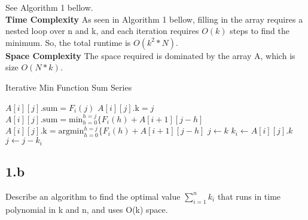 \documentclass[11pt]{article}
\begin{document}
\begin{solution}
See Algorithm 1 bellow. \\

\textbf{Time Complexity}
As seen in Algorithm 1 bellow, filling in the array requires a nested loop over n and k, and each iteration requires $O(k)$ steps to find the minimum. So, the total runtime is $O(k^2*N)$. \\
\textbf{Space Complexity}
The space required is dominated by the array A, which is size $O(N*k)$.
\begin{algorithm}
\caption{Iterative Min Function Sum Series}
\begin{algorithmic}
\STATE $A[i][j].\text{sum} = F_i(j)$
\STATE $A[i][j].\text{k} = j$
\ELSE
\STATE $A[i][j].\text{sum} = \text{min}_{h=0}^{h=j} \{ F_i(h) + A[i+1][j-h]$
\STATE $A[i][j].\text{k} = \text{argmin}_{h=0}^{h=j} \{ F_i(h) + A[i+1][j-h]$
\ENDIF
\ENDFOR
\ENDFOR
\STATE $j \gets k$
\STATE $k_i \gets A[i][j].k$
\STATE $j \gets j - k_i$
\ENDFOR
\end{algorithmic}
\end{algorithm} 
\end{solution}

\clearpage



\subsection *{1.b} Describe an algorithm to find the optimal value $\sum_{i=1}^{n} k_i$ that runs in time polynomial in k and n, and uses O(k) space. 
\end{document}
